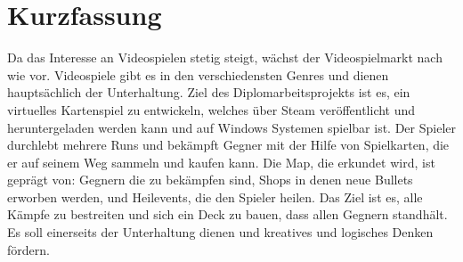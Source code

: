\chapter*{Kurzfassung}

Da das Interesse an Videospielen stetig steigt, wächst der Videospielmarkt nach wie vor.
Videospiele gibt es in den verschiedensten Genres und dienen hauptsächlich der Unterhaltung.
Ziel des Diplomarbeitsprojekts ist es, ein virtuelles Kartenspiel zu entwickeln, welches über Steam veröffentlicht und heruntergeladen werden kann und auf Windows Systemen spielbar ist. Der Spieler durchlebt mehrere Runs und bekämpft Gegner mit der Hilfe von Spielkarten, die er auf seinem Weg sammeln und kaufen kann. Die Map, die erkundet wird, ist geprägt von: Gegnern die zu bekämpfen sind, Shops in denen neue Bullets erworben werden, und Heilevents, die den Spieler heilen. Das Ziel ist es, alle Kämpfe zu bestreiten und sich ein Deck zu bauen, dass allen Gegnern standhält.
Es soll einerseits der Unterhaltung dienen und kreatives und logisches Denken fördern.
